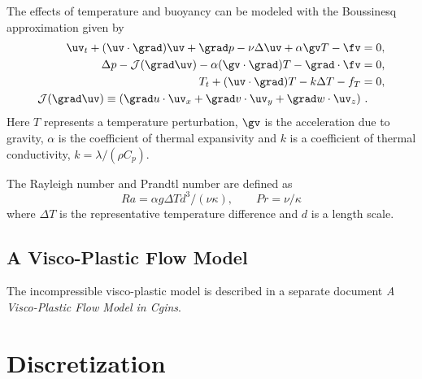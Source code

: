 \documentclass[10pt]{article}
\begin{document}
The effects of temperature and buoyancy can be modeled with the Boussinesq approximation
given by
\begin{align*}
  \uv_t + (\uv\cdot\grad)\uv + \grad p -\nu \Delta \uv +\alpha \gv T  -\fv &=0 ,\\
  \Delta p - \Jc(\grad\uv) -\alpha (\gv\cdot\grad) T - \grad\cdot\fv &=0,  \\
  T_t + (\uv\cdot\grad) T - k \Delta T - f_T &=0 , \\
  \Jc(\grad\uv) \equiv (\grad u\cdot\uv_x + \grad v\cdot\uv_y + \grad w\cdot \uv_z) &~.
\end{align*}
Here $T$ represents a temperature perturbation, $\gv$ is the acceleration due to gravity,
$\alpha$ is the coefficient of thermal expansivity and $k$ is a coefficient of
thermal conductivity, $k=\lambda/(\rho C_p)$. 


The Rayleigh number and Prandtl number are defined
as
\[
   Ra = \alpha g \Delta T d^3 /(\nu\kappa), \qquad Pr = \nu/\kappa 
\]
where $\Delta T$ is the representative temperature difference and $d$ is a length scale. 



% 

\subsection{A Visco-Plastic Flow Model}

   The incompressible visco-plastic model is described in a separate document {\em A Visco-Plastic Flow Model in Cgins}.


\section{ Discretization}
\end{document}
